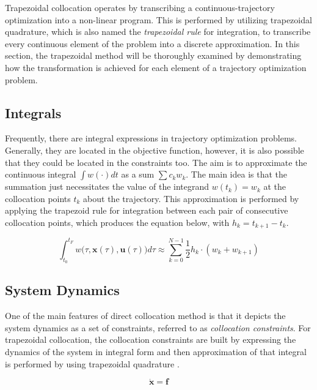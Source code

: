 \documentclass{thesisreport}
\begin{document}
 Trapezoidal collocation operates by transcribing a continuous-trajectory optimization into a non-linear program. This is performed by utilizing trapezoidal quadrature, which is also named the \textit{trapezoidal rule} for integration, to transcribe every continuous element of the problem into a discrete approximation. In this section, the trapezoidal method will be thoroughly examined by demonstrating how the transformation is achieved for each element of a trajectory optimization problem.
 
\subsection{Integrals}

Frequently, there are integral expressions in trajectory optimization problems. Generally, they are located in the objective function, however, it is also possible that they could be located in the constraints too. The aim is to approximate the continuous integral $\int w(\cdot) dt$ as a sum $\sum c_k w_k$. The main idea is that the summation just necessitates the value of the integrand  $w(t_k)=w_k$ at the collocation points $t_k$ about the trajectory. This approximation is performed by applying the trapezoid rule for integration between each pair of consecutive collocation points, which produces the equation below, with $h_k=t_{k+1} - t_k$. \cite{Betts2010}
 
 \begin{equation}
 \int_{t_0}^{t_F} w \big( \tau,\bm{x}(\tau),\bm{u}(\tau)\big)d \tau \approx \sum\limits_{k=0}^{N-1} \frac{1}{2} h_k \cdot (w_k + w_{k+1})
 \end{equation}
 
 \newpage
 
\subsection{System Dynamics}

One of the main features of direct collocation method is that it depicts the system dynamics as a set of constraints, referred to as \textit{collocation constraints}. For trapezoidal collocation, the collocation constraints are built by expressing the dynamics of the system in integral form and then approximation of that integral is performed by using trapezoidal quadrature \cite{Betts2010}. 

\begin{equation*}
\dot{\bm{x}}= \bm{f}
\end{equation*}
 
\end{document}
